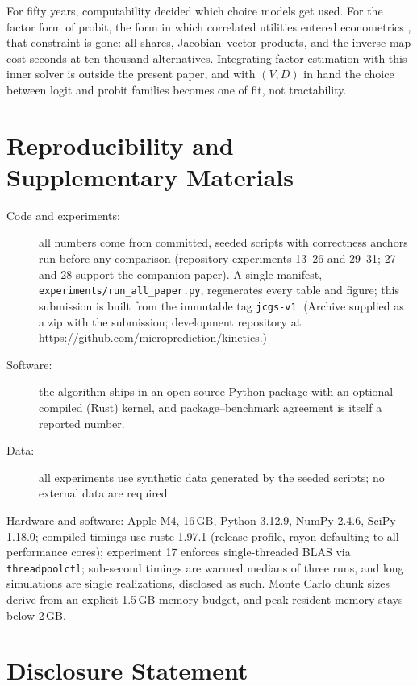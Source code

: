 \documentclass[12pt]{article}
\theoremstyle{remark}
\begin{document}
For fifty years, computability decided which choice models get used. For
the factor form of probit, the form in which correlated utilities entered
econometrics \citep{hausman1978}, that constraint is gone: all shares, Jacobian--vector products, and
the inverse map cost seconds at ten thousand alternatives. Integrating
factor estimation with this inner solver is outside the present paper,
and with $(V, D)$ in hand the choice
between logit and probit families becomes one of fit, not tractability.

\section*{Reproducibility and Supplementary Materials}

\begin{description}
\item[Code and experiments:] all numbers come from committed, seeded
scripts with correctness anchors run before any comparison (repository
experiments 13--26 and 29--31; 27 and 28 support the companion paper).
A single manifest,
\texttt{experiments/run\_all\_paper.py}, regenerates every table and
figure; this submission is built from the immutable tag
\texttt{jcgs-v1}. (Archive supplied as a zip with
the submission; development repository at
\url{https://github.com/microprediction/kinetics}.)
\item[Software:] the algorithm ships in an open-source Python package
with an optional compiled (Rust) kernel, and package--benchmark agreement
is itself a reported number.
\item[Data:] all experiments use synthetic data generated by the seeded
scripts; no external data are required.
\end{description}

Hardware and software: Apple M4, 16\,GB, Python 3.12.9,
NumPy 2.4.6, SciPy 1.18.0; compiled timings use rustc 1.97.1
(release profile, rayon defaulting to all performance cores); experiment 17 enforces single-threaded BLAS via
\texttt{threadpoolctl}; sub-second timings are warmed medians of three
runs, and long simulations are single realizations, disclosed as such.
Monte Carlo chunk sizes derive from an explicit 1.5\,GB memory budget, and
peak resident memory stays below 2\,GB.

\section*{Disclosure Statement}
\end{document}

